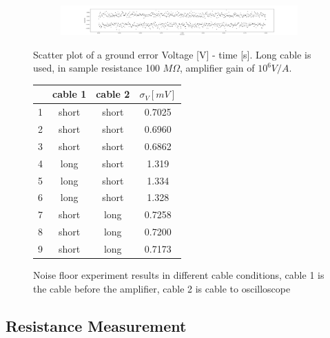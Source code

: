 \documentclass{article}
\begin{document}
\label{subsection: Noise Floor Detection}
\begin{figure}[H]
    \centering
    \begin{subfigure}[b]{14cm}
        \centering
        \includegraphics[width=14cm]{./figs/figure0.png}
        \caption{}
    \end{subfigure}
    \hfill
    \caption{Scatter plot of a ground error Voltage [V] - time [s]. Long cable is used, in sample resistance 100 $M \Omega$, amplifier gain of $10^6 V/A$.}
    \label{fig: ground error scatter plot}
\end{figure}

\begin{figure}[H]
    \centering
    \begin{tabular}{c|c|c|c}
        \centering
          & cable 1 & cable 2 & $\sigma_V [mV]$ \\ \hline
        1 & short   & short   & 0.7025          \\ \hline
        2 & short   & short   & 0.6960          \\ \hline
        3 & short   & short   & 0.6862          \\ \hline
        4 & long    & short   & 1.319           \\ \hline
        5 & long    & short   & 1.334           \\ \hline
        6 & long    & short   & 1.328           \\ \hline
        7 & short   & long    & 0.7258          \\ \hline
        8 & short   & long    & 0.7200          \\ \hline
        9 & short   & long    & 0.7173          \\ \hline
    \end{tabular}
    \caption{Noise floor experiment results in different cable conditions, cable 1 is the cable before the amplifier, cable 2 is cable to oscilloscope}
    \label{fig: ground error result}
\end{figure}

\subsection{Resistance Measurement}
\label{subsection: Resistance Measurement}
\end{document}
